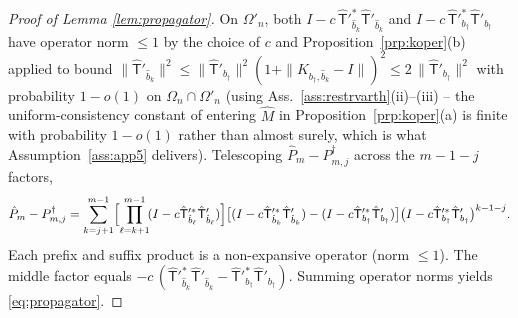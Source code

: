 \begin{proof}[Proof of Lemma \ref{lem:propagator}]
On $\Omega'_n$, both $I - c\,\hat{\mathsf T}'^*_{\hat b_k}\hat{\mathsf T}'_{\hat b_k}$
and $I - c\,\hat{\mathsf T}'^*_{b_\dagger}\hat{\mathsf T}'_{b_\dagger}$ have operator
norm $\le 1$ by the choice of $c$ and Proposition~\ref{prp:koper}\textup{(b)}
applied to bound $\|\hat{\mathsf T}'_{\hat b_k}\|^2 \le \|\hat{\mathsf T}'_{b_\dagger}\|^2
(1 + \|K_{b_\dagger,\hat b_k}-I\|)^2 \le 2\,\|\hat{\mathsf T}'_{b_\dagger}\|^2$
with probability $1 - o(1)$ on $\Omega_n \cap \Omega'_n$ (using
Ass.~\ref{ass:restrvarth}\textup{(ii)--(iii)} -- the uniform-consistency
constant of \citet{dunker2018} entering $\hat M$ in
Proposition~\ref{prp:koper}\textup{(a)} is finite with probability
$1 - o(1)$ rather than almost surely, which is what
Assumption~\ref{ass:app5} delivers). %
Telescoping
$\hat P_m - P^{\dagger}_{m,j}$ across the $m - 1 - j$ factors,
\[
\hat P_m - P^{\dagger}_{m,j}
= \sum_{k=j+1}^{m-1}
\Bigl[\prod_{\ell = k+1}^{m-1}\!(I - c\hat{\mathsf T}'^*_{\hat b_\ell}\hat{\mathsf T}'_{\hat b_\ell})\Bigr]
\bigl[(I - c\hat{\mathsf T}'^*_{\hat b_k}\hat{\mathsf T}'_{\hat b_k}) - (I - c\hat{\mathsf T}'^*_{b_\dagger}\hat{\mathsf T}'_{b_\dagger})\bigr]
\bigl(I - c\hat{\mathsf T}'^*_{b_\dagger}\hat{\mathsf T}'_{b_\dagger}\bigr)^{k - 1 - j}.
\]
Each prefix and suffix product is a non-expansive operator (norm $\le 1$).
The middle factor equals
$-c\,(\hat{\mathsf T}'^*_{\hat b_k}\hat{\mathsf T}'_{\hat b_k}
- \hat{\mathsf T}'^*_{b_\dagger}\hat{\mathsf T}'_{b_\dagger})$. Summing
operator norms yields \eqref{eq:propagator}.


\end{proof}
